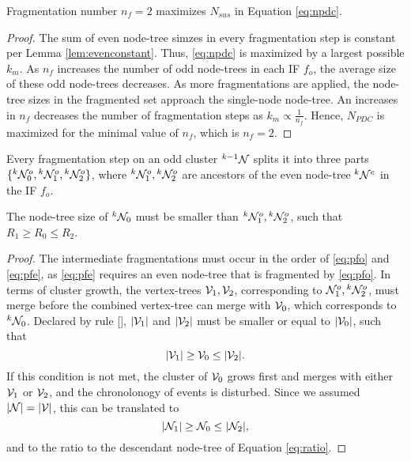 \begin{theorem}\label{the:fragnumber}
  Fragmentation number $n_f=2$ maximizes $N_{sus}$ in Equation \eqref{eq:npdc}.
\end{theorem}
\begin{proof}
  The sum of even node-tree simzes in every fragmentation step is constant per Lemma \ref{lem:evenconstant}. Thus, \eqref{eq:npdc} is maximized by a largest possible $k_m$.  As $n_f$ increases the number of odd node-trees in each IF $f_o$, the average size of these odd node-trees decreases. As more fragmentations are applied, the node-tree sizes in the fragmented set approach the single-node node-tree. An increases in $n_f$ decreases the number of fragmentation steps as $ k_m \propto \frac{1}{n_f}$.  Hence, $N_{PDC}$ is maximized for the minimal value of $n_f$, which is $n_f = 2$.
\end{proof}

Every fragmentation step on an odd cluster ${}^{k-1}\mathcal{N}$ splits it into three parts $\{{}^{k}\mathcal{N}^o_0, {}^{k}\mathcal{N}^o_1, {}^{k}\mathcal{N}^o_2\}$, where ${}^{k}\mathcal{N}^o_1, {}^{k}\mathcal{N}^o_2$ are ancestors of the even node-tree ${}^{k}\mathcal{N}^e$ in the IF $f_o$. 

\begin{lemma}\label{lem:chrono}
  The node-tree size of ${}^{k}\mathcal{N}_0$ must be smaller than ${}^{k}\mathcal{N}^o_1, {}^{k}\mathcal{N}^o_2$, such that $R_1 \geq R_0 \leq R_2$. 
\end{lemma}
\begin{proof}
  The intermediate fragmentations must occur in the order of \eqref{eq:pfo} and \eqref{eq:pfe}, as \eqref{eq:pfe} requires an even node-tree that is fragmented by \eqref{eq:pfo}. In terms of cluster growth, the vertex-trees $\mathcal{V}_1, \mathcal{V}_2$, corresponding to $\mathcal{N}^o_1, {}^{k}\mathcal{N}^o_2$, must merge before the combined vertex-tree can merge with $\mathcal{V}_0$, which corresponds to ${}^{k}\mathcal{N}_0$. Declared by rule [], $\lvert\mathcal{V}_1\rvert$ and $\lvert\mathcal{V}_2\rvert$ must be smaller or equal to $\lvert\mathcal{V}_0\rvert$, such that 
  \begin{equation*}
    \lvert\mathcal{V}_1\rvert\geq \mathcal{V}_0 \leq\lvert\mathcal{V}_2\rvert.
  \end{equation*}
  If this condition is not met, the cluster of $\mathcal{V}_0$ grows first and merges with either $\mathcal{V}_1$ or $\mathcal{V}_2$, and the chronolonogy of events is disturbed. Since we assumed $\lvert\mathcal{N}\rvert=\lvert\mathcal{V}\rvert$, this can be translated to 
  \begin{equation*}
    \lvert\mathcal{N}_1\rvert\geq \mathcal{N}_0 \leq\lvert\mathcal{N}_2\rvert,
  \end{equation*}
  and to the ratio to the descendant node-tree of Equation \eqref{eq:ratio}.
\end{proof}

